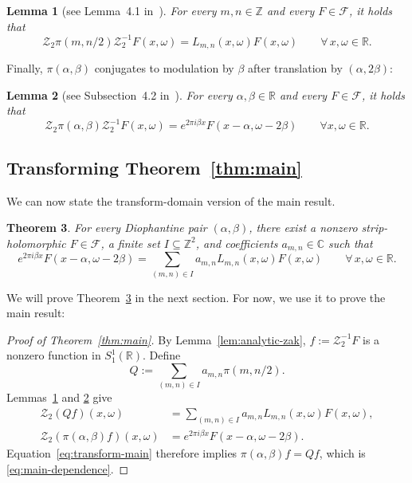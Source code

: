\documentclass[10pt,a4paper]{amsart}
\newtheorem{theorem}{Theorem}
\newtheorem{lemma}[theorem]{Lemma}
\newcommand{\R}{\mathbb{R}}
\newcommand{\C}{\mathbb{C}}
\newcommand{\Z}{\mathbb{Z}}
\newcommand{\vZak}{\mathcal{Z}_2}
\begin{document}
\begin{lemma}[see Lemma~4.1 in~\cite{FaulhuberPvC:26}]
\label{lem:lattice-action}
For every $m,n\in\Z$ and every $F\in\mathcal{F}$, it holds that
\[
  \vZak\pi(m,n/2)\vZak^{-1}F(x,\omega)
  =L_{m,n}(x,\omega)F(x,\omega)
  \qquad
  \forall\,x,\omega\in\mathbb{R}.
\]
\end{lemma}

Finally, $\pi(\alpha,\beta)$ conjugates to modulation by $\beta$ after translation by $(\alpha,2\beta)$:

\begin{lemma}[see Subsection~4.2 in~\cite{FaulhuberPvC:26}]
\label{lem:irrational-action}
For every $\alpha,\beta\in\mathbb{R}$ and every $F\in\mathcal{F}$, it holds that
\[
  \vZak\pi(\alpha,\beta)\vZak^{-1}F(x,\omega)
  =e^{2\pi i\beta x}F(x-\alpha,\omega-2\beta)
\qquad\forall x,\omega\in\mathbb{R}.
\]
\end{lemma}

\subsection{Transforming Theorem~\ref{thm:main}}

We can now state the transform-domain version of the main result.

\begin{theorem}\label{thm:transform}
For every Diophantine pair $(\alpha,\beta)$, there exist a nonzero strip-holomorphic $F\in\mathcal{F}$, a finite set $I\subseteq\Z^2$, and
coefficients $a_{m,n}\in\C$ such that
\begin{equation}\label{eq:transform-main}
  e^{2\pi i\beta x}F(x-\alpha,\omega-2\beta)
  =\sum_{(m,n)\in I}a_{m,n}L_{m,n}(x,\omega)F(x,\omega)
  \qquad\forall\,x,\omega\in\R.
\end{equation}
\end{theorem}

We will prove Theorem~\ref{thm:transform} in the next section.
For now, we use it to prove the main result:


\begin{proof}[Proof of Theorem~\ref{thm:main}]
By Lemma~\ref{lem:analytic-zak},
$f:=\vZak^{-1}F$ is a nonzero function in $S_1^1(\R)$.  Define
\[
  Q:=\sum_{(m,n)\in I}a_{m,n}\pi(m,n/2).
\]
Lemmas~\ref{lem:lattice-action} and \ref{lem:irrational-action} give
\begin{align*}
  \vZak(Qf)(x,\omega)&=\sum_{(m,n)\in I}a_{m,n}L_{m,n}(x,\omega)F(x,\omega),\\[0.4em]
  \vZak(\pi(\alpha,\beta)f)(x,\omega)&=e^{2\pi i\beta x}F(x-\alpha,\omega-2\beta).
\end{align*}
Equation~\eqref{eq:transform-main} therefore implies
$\pi(\alpha,\beta)f=Qf$, which is \eqref{eq:main-dependence}.
\end{proof}
\end{document}
